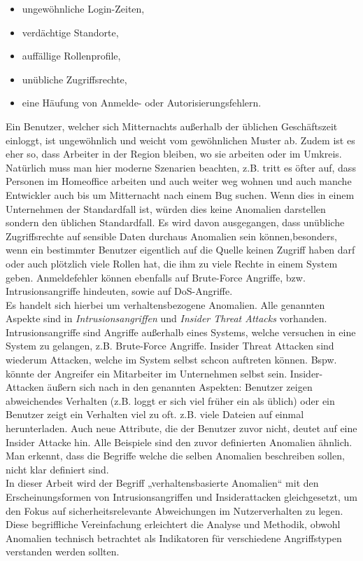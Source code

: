 \documentclass[a4paper,12pt]{article}
\begin{document}
	\begin{itemize}
		\item ungewöhnliche Login-Zeiten,
		\item verdächtige Standorte,
		\item auffällige Rollenprofile,
		\item unübliche Zugriffsrechte,
		\item eine Häufung von Anmelde- oder Autorisierungsfehlern.
	\end{itemize}
	Ein Benutzer, welcher sich Mitternachts außerhalb der üblichen Geschäftszeit einloggt, ist ungewöhnlich und weicht vom gewöhnlichen Muster ab. Zudem ist es eher so, dass Arbeiter in der Region bleiben, wo sie arbeiten oder im Umkreis. Natürlich muss man hier moderne Szenarien beachten, z.B. tritt es öfter auf, dass Personen im Homeoffice arbeiten und auch weiter weg wohnen und auch manche Entwickler auch bis um Mitternacht nach einem Bug suchen. Wenn dies in einem Unternehmen der Standardfall ist, würden dies keine Anomalien darstellen sondern den üblichen Standardfall. Es wird davon ausgegangen, dass unübliche Zugriffsrechte auf sensible Daten durchaus Anomalien sein können,besonders, wenn ein bestimmter Benutzer eigentlich auf die Quelle keinen Zugriff haben darf oder auch plötzlich viele Rollen hat, die ihm zu viele Rechte in einem System geben. Anmeldefehler können ebenfalls auf Brute-Force Angriffe, bzw. Intrusionsangriffe hindeuten, sowie auf DoS-Angriffe.
	\\[0.5em]
	Es handelt sich hierbei um verhaltensbezogene Anomalien. Alle genannten Aspekte sind in \textit{Intrusionsangriffen} und \textit{Insider Threat Attacks} vorhanden. Intrusionsangriffe sind Angriffe außerhalb eines Systems, welche versuchen in eine System zu gelangen, z.B. Brute-Force Angriffe. Insider Threat Attacken sind wiederum Attacken, welche im System selbst schcon auftreten können. Bspw. könnte der Angreifer ein Mitarbeiter im Unternehmen selbst sein.
	Insider-Attacken äußern sich nach \cite{legg2015visualizing} in den genannten Aspekten: Benutzer zeigen abweichendes Verhalten (z.B. loggt er sich viel früher ein als üblich) oder ein Benutzer zeigt ein Verhalten viel zu oft. z.B. viele Dateien auf einmal herunterladen. Auch neue Attribute, die der Benutzer zuvor nicht, deutet auf eine Insider Attacke hin. Alle Beispiele sind den zuvor definierten Anomalien ähnlich. Man erkennt, dass die Begriffe welche die selben Anomalien beschreiben sollen, nicht klar definiert sind.
	\\[0.5em]
	In dieser Arbeit wird der Begriff „verhaltensbasierte Anomalien“ mit den Erscheinungsformen von Intrusionsangriffen und Insiderattacken gleichgesetzt, um den Fokus auf sicherheitsrelevante Abweichungen im Nutzerverhalten zu legen. Diese begriffliche Vereinfachung erleichtert die Analyse und Methodik, obwohl Anomalien technisch betrachtet als Indikatoren für verschiedene Angriffstypen verstanden werden sollten.
\end{document}
